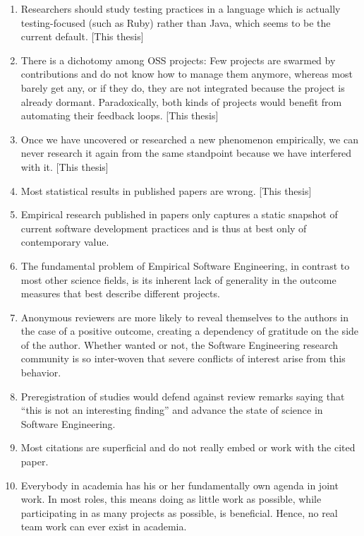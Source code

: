 \documentclass{dissertation}
\begin{document}
\begin{enumerate}
\item Researchers should study testing practices in a language which is actually testing-focused
  (such as Ruby) rather than Java, which seems to be the current default. [This thesis]
\item There is a dichotomy among OSS projects: Few projects are swarmed by contributions and do not
  know how to manage them anymore, whereas most barely get any, or if they do, they are not
  integrated because the project is already dormant. Paradoxically, both kinds of projects would
  benefit from automating their feedback loops. [This thesis]
\item Once we have uncovered or researched a new phenomenon empirically, we can never research it
  again from the same standpoint because we have interfered with it. [This thesis]
\item Most statistical results in published papers are wrong. [This thesis]
\item Empirical research published in papers only captures a static snapshot of current software
  development practices and is thus at best only of contemporary value. 
\item The fundamental problem of Empirical Software Engineering, in contrast to most other science
  fields, is its inherent lack of generality in the outcome measures that best describe different
  projects.
\item Anonymous reviewers are more likely to reveal themselves to the authors in the case of a
  positive outcome, creating a dependency of gratitude on the side of the author. Whether wanted or
  not, the Software Engineering research community is so inter-woven that severe conflicts of
  interest arise from this behavior.
\item Preregistration of studies would defend against review remarks saying that ``this is not an
  interesting finding'' and advance the state of science in Software Engineering.
\item Most citations are superficial and do not really embed or work with the cited paper.
\item Everybody in academia has his or her fundamentally own agenda in joint work. In most roles,
  this means doing as little work as possible, while participating in as many projects as possible,
  is beneficial. Hence, no real team work can ever exist in academia.
\end{enumerate}

\bigskip
\bigskip
\end{document}
